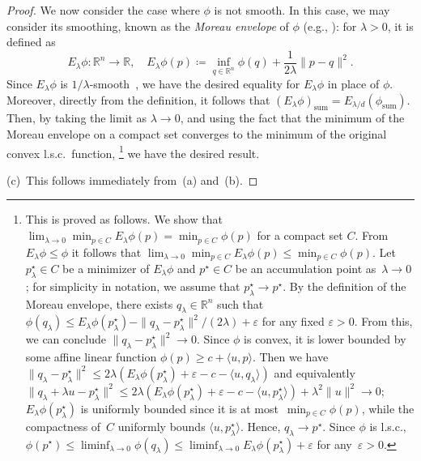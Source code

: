 \documentclass[11pt,letterpaper]{article}
\numberwithin{equation}{section}
\newcommand{\RR}{\mathbb{R}}
\DeclareMathOperator{\Sum}{sum}
\begin{document}
\begin{proof}
We now consider the case where $\phi$ is not smooth.
In this case, we may consider its smoothing, known as the \emph{Moreau envelope} of $\phi$ (e.g., \cite[\S{}1.G]{RW1998}): for $\lambda > 0$, it is defined as
\[
    E_\lambda\phi \colon \RR^n \to \RR,\quad E_\lambda\phi(p) \coloneqq \inf_{q \in \RR^n}\phi(q) + \frac1{2\lambda}\|p - q\|^2.
\]
Since $E_\lambda\phi$ is $1/\lambda$-smooth~\cite[Thm.~2.26]{RW1998}, we have the desired equality for $E_\lambda\phi$ in place of $\phi$.
Moreover, directly from the definition, it follows that $(E_\lambda\phi)_{\Sum} = E_{\lambda/d}(\phi_{\Sum})$.
Then, by taking the limit as $\lambda \to 0$, and using the fact that the minimum of the Moreau envelope on a compact set converges to the minimum of the original convex l.s.c.\ function,%
\footnote{This is proved as follows.
We show that $\lim_{\lambda \to 0}\min_{p \in C}E_\lambda\phi(p) = \min_{p \in C}\phi(p)$ for a compact set $C$.
From $E_\lambda\phi \le \phi$ it follows that $\lim_{\lambda \to 0}\min_{p \in C}E_\lambda\phi(p) \le \min_{p \in C}\phi(p)$.
Let $p^\star_\lambda \in C$ be a minimizer of $E_\lambda\phi$ and $p^\star \in C$ be an accumulation point as~$\lambda\to0$; for simplicity in notation, we assume that $p^\star_\lambda \to p^\star$.
By the definition of the Moreau envelope, there exists $q_\lambda \in \RR^n$ such that $\phi(q_\lambda) \le E_\lambda\phi(p^\star_\lambda) - \|q_\lambda - p^\star_\lambda\|^2/(2\lambda) + \varepsilon$ for any fixed $\varepsilon > 0$.
From this, we can conclude $\|q_\lambda - p^\star_\lambda\|^2 \to 0$.
Since $\phi$ is convex, it is lower bounded by some affine linear function $\phi(p) \ge c + \langle u, p\rangle$.
Then we have $\|q_\lambda - p^\star_\lambda\|^2 \le 2\lambda(E_\lambda\phi(p_\lambda^\star) + \varepsilon - c - \langle u, q_\lambda\rangle)$ and equivalently $\|q_\lambda + \lambda u- p^\star_\lambda\|^2 \le 2\lambda(E_\lambda\phi(p_\lambda^\star) + \varepsilon - c - \langle u, p^\star_\lambda\rangle) + \lambda^2\|u\|^2\to 0$;
$E_\lambda\phi(p_\lambda^\star)$ is uniformly bounded since it is at most~$\min_{p \in C} \phi(p)$, while the compactness of~$C$ uniformly bounds $\langle u,p_\lambda^\star\rangle$.
Hence, $q_\lambda \to p^\star$.
Since $\phi$ is l.s.c., $\phi(p^\star) \le \liminf_{\lambda \to 0}\phi(q_\lambda) \le \liminf_{\lambda \to 0}E_\lambda\phi(p^\star_\lambda) + \varepsilon$ for any~$\varepsilon > 0$.}
we have the desired result.

(c)~This follows immediately from~(a) and~(b).


\end{proof}
\end{document}
